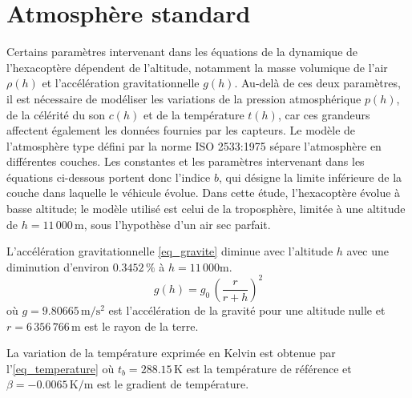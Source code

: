 \documentclass[11pt,a4paper,oneside]{report}
\begin{document}
	\section{Atmosphère standard}
	\label{sec_atmosphere}
	
	Certains paramètres intervenant dans les équations de la dynamique de l'hexacoptère dépendent de l'altitude, notamment la masse volumique de l'air \(\rho(h)\) et l'accélération gravitationnelle \(g(h)\). Au-delà de ces deux paramètres, il est nécessaire de modéliser les variations de la pression atmosphérique \(p(h)\), de la célérité du son \(c(h)\) et de la température \(t(h)\), car ces grandeurs affectent également les données fournies par les capteurs.
	Le modèle de l'atmosphère type défini par la norme ISO 2533:1975 \cite{ISO2533_1975} sépare l'atmosphère en différentes couches. Les constantes et les paramètres intervenant dans les équations ci-dessous portent donc l'indice \(b\), qui désigne la limite inférieure de la couche dans laquelle le véhicule évolue. Dans cette étude, l'hexacoptère évolue à basse altitude; le modèle utilisé est celui de la troposphère, limitée à une altitude de \(h = 11\,000\,\si{\meter}\), sous l'hypothèse d'un air sec parfait. 
	
	
	L'accélération gravitationnelle \cref{eq_gravite} diminue avec l'altitude \(h\) avec une diminution d'environ \(0.3452\, \% \) à \(h = 11\,000 \si{\meter}\). 
	\begin{equation}
		g(h) = g_0 \, \left(\frac{r}{r + h}\right)^2
		\label{eq_gravite}
	\end{equation}
	où \(g = 9.80665\, \si{\meter \per \second^2} \) est l'accélération de la gravité pour une altitude nulle et \(r = 6\,356\,766\, \si{\meter}\) est le rayon de la terre.
	
	La variation de la température exprimée en Kelvin est obtenue par l'\cref{eq_temperature} où \(t_b = 288.15\, \si{\kelvin}\) est la température de référence et \(\beta = -0.0065\, \si{\kelvin \per \meter} \) est le gradient de température.
	
\end{document}

